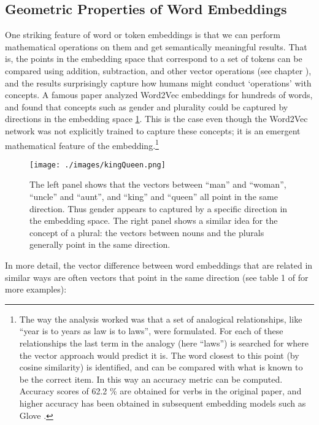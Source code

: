 \subsection{Geometric Properties of Word Embeddings}\label{geometryWordEmbeddings}

One striking feature of word or token embeddings is that we can perform mathematical operations on them and get semantically meaningful results. That is, the points in the embedding space that correspond to a set of tokens can be compared using addition, subtraction, and other vector operations (see chapter ), and the results surprisingly capture how humans might conduct `operations' with concepts.  A famous paper \cite{mikolov2013linguistic} analyzed Word2Vec embeddings for hundreds of words, and found that concepts such as gender and plurality could be captured by directions in the embedding space \ref{geometryWordEmbedding}. This is the case even though the Word2Vec network was not explicitly trained to capture these concepts; it is an emergent mathematical feature of the embedding.\footnote{The way the analysis worked was that a set of analogical relationships, like ``year is to years as law is to laws'', were formulated.  For each of these relationships the last term in the analogy (here ``laws'') is searched for where the vector approach would predict it is. The word closest to this point (by cosine similarity) is identified, and can be compared with what is known to be the correct item. In this way an accuracy metric can be computed.  Accuracy scores of 62.2 \% are obtained for verbs in the original paper, and higher accuracy has been obtained in subsequent embedding models such as Glove \cite{pennington2014glove}.}

\begin{figure}[h]
\centering
\texttt{[image: ./images/kingQueen.png]}
\caption[From \cite{mikolov2013linguistic}.]{The left panel shows that the vectors between ``man'' and ``woman'', ``uncle'' and ``aunt'', and ``king'' and ``queen'' all point in the same direction. Thus gender appears to captured by a specific direction in the embedding space. The right panel shows a similar idea for the concept of a plural: the vectors between nouns and the plurals generally point in the same direction.}
\label{geometryWordEmbedding}
\end{figure}

In more detail, the vector difference between word embeddings that are related in similar ways are often vectors that point in the same direction (see table 1 of \cite{mikolov2013linguistic} for more examples):


